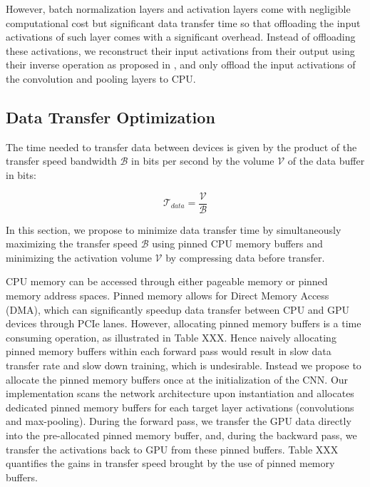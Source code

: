 \documentclass[11pt,onecolumn]{article}
\begin{document}
However, batch normalization layers and activation layers come with negligible computational cost 
but significant data transfer time so that offloading the input activations of such layer comes with
a significant overhead.
Instead of offloading these activations, we reconstruct their input activations 
from their output using their inverse operation as proposed in \cite{xxx},
and only offload the input activations of the convolution and pooling layers to CPU. 

 \subsection{Data Transfer Optimization}
The time needed to transfer data between devices is given by the product of the
transfer speed bandwidth $\mathcal{B}$ in bits per second by the volume 
$\mathcal{V}$ of the data buffer in bits:

\begin{equation}
\mathcal{T}_{data} = \frac{\mathcal{V}}{\mathcal{B}}
\end{equation}

In this section, we propose to minimize data transfer time by simultaneously 
maximizing the transfer speed $\mathcal{B}$
using pinned CPU memory buffers and 
minimizing the activation volume $\mathcal{V}$ by compressing data before transfer.

CPU memory can be accessed through either pageable memory or pinned memory address spaces.
Pinned memory allows for Direct Memory Access (DMA), 
which can significantly speedup data transfer between CPU and GPU devices through PCIe lanes.
However, allocating pinned memory buffers is a time consuming operation, as illustrated in Table XXX.
Hence naively allocating pinned memory buffers within each forward pass would
result in slow data transfer rate and slow down training, which is undesirable.
Instead we propose to allocate the pinned memory buffers once at the initialization of the CNN.
Our implementation scans the network architecture upon instantiation
and allocates dedicated pinned memory buffers for each 
target layer activations (convolutions and max-pooling). 
During the forward pass, we transfer the GPU data directly into the pre-allocated pinned memory buffer,
and, during the backward pass, we transfer the activations back to GPU from these pinned buffers.
Table XXX quantifies the gains in transfer speed brought by the use of pinned memory buffers.
\end{document}
